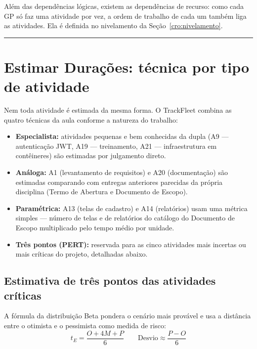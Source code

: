 \documentclass[11pt,a4paper]{article}
\newcommand{\separador}{\par\vspace{2mm}\hrule\vspace{4mm}}
\begin{document}
\noindent Além das dependências lógicas, existem as dependências de recurso: como cada GP só faz uma atividade por vez, a ordem de trabalho de cada um também liga as atividades. Ela é definida no nivelamento da Seção~\ref{cro:nivelamento}.

\separador

\section{Estimar Durações: técnica por tipo de atividade}\label{cro:estimativas}

\noindent Nem toda atividade é estimada da mesma forma. O TrackFleet combina as quatro técnicas da aula conforme a natureza do trabalho:

\begin{itemize}[itemsep=3pt]
  \item \textbf{Especialista:} atividades pequenas e bem conhecidas da dupla (A9 --- autenticação JWT, A19 --- treinamento, A21 --- infraestrutura em contêineres) são estimadas por julgamento direto.
  \item \textbf{Análoga:} A1 (levantamento de requisitos) e A20 (documentação) são estimadas comparando com entregas anteriores parecidas da própria disciplina (Termo de Abertura e Documento de Escopo).
  \item \textbf{Paramétrica:} A13 (telas de cadastro) e A14 (relatórios) usam uma métrica simples --- número de telas e de relatórios do catálogo do Documento de Escopo multiplicado pelo tempo médio por unidade.
  \item \textbf{Três pontos (PERT):} reservada para as cinco atividades mais incertas ou mais críticas do projeto, detalhadas abaixo.
\end{itemize}

\subsection{Estimativa de três pontos das atividades críticas}\label{cro:pert}
A fórmula da distribuição Beta pondera o cenário mais provável e usa a distância entre o otimista e o pessimista como medida de risco:
\[
t_E = \frac{O + 4M + P}{6} \qquad \text{Desvio} \approx \frac{P - O}{6}
\]
\end{document}
